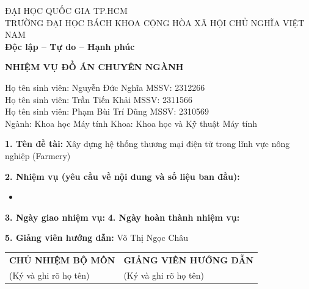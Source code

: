 \begin{titlepage}
\begin{center}
ĐẠI HỌC QUỐC GIA TP.HCM \\
TRƯỜNG ĐẠI HỌC BÁCH KHOA
\hfill
CỘNG HÒA XÃ HỘI CHỦ NGHĨA VIỆT NAM\\
\textbf{Độc lập -- Tự do -- Hạnh phúc}
\end{center}

\vspace{1cm}
\begin{center}
\textbf{\Large NHIỆM VỤ ĐỒ ÁN CHUYÊN NGÀNH}
\end{center}
\vspace{0.5cm}

\noindent Họ tên sinh viên: Nguyễn Đức Nghĩa \hfill MSSV: 2312266\\
Họ tên sinh viên: Trần Tiến Khải \hfill MSSV: 2311566\\
Họ tên sinh viên: Phạm Bùi Trí Dũng \hfill MSSV: 2310569\\
Ngành: Khoa học Máy tính \hfill Khoa: Khoa học và Kỹ thuật Máy tính

\vspace{0.5cm}
\noindent \textbf{1. Tên đề tài:} Xây dựng hệ thống thương mại điện tử trong lĩnh vực nông nghiệp (Farmery)

\vspace{0.3cm}
\noindent \textbf{2. Nhiệm vụ (yêu cầu về nội dung và số liệu ban đầu):}
\begin{itemize}
    \item[]
\end{itemize}

\vspace{0.3cm}
\noindent \textbf{3. Ngày giao nhiệm vụ:} \underline{\hspace{3cm}}
\hfill
\textbf{4. Ngày hoàn thành nhiệm vụ:} \underline{\hspace{3cm}}

\vspace{0.3cm}
\noindent \textbf{5. Giảng viên hướng dẫn:} Võ Thị Ngọc Châu

\vspace{2cm}
\begin{center}
\begin{tabular}{>{\centering\arraybackslash}p{6cm}>{\centering\arraybackslash}p{6cm}}
\textbf{CHỦ NHIỆM BỘ MÔN} & \textbf{GIẢNG VIÊN HƯỚNG DẪN} \\
(Ký và ghi rõ họ tên) & (Ký và ghi rõ họ tên) \\
\end{tabular}
\end{center}
\end{titlepage}
